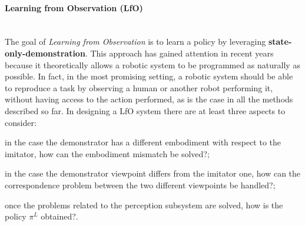 \paragraph{Learning from Observation (LfO)} \mbox{} \\
\label{sec:lfo}
The goal of \textit{Learning from Observation} is to learn a policy by leveraging \textbf{state-only-demonstration}. This approach has gained attention in recent years because it theoretically allows a robotic system to be programmed as naturally as possible. In fact, in the most promising setting, a robotic system should be able to reproduce a task by observing a human or another robot performing it, without having access to the action performed, as is the case in all the methods described so far. In designing a LfO system there are at least three aspects to consider: \begin{enumerate*}[label=\textbf{(\arabic*)}]
    \item in the case the demonstrator has a different embodiment with respect to the imitator, how can the embodiment mismatch be solved?;
    \item in the case the demonstrator viewpoint differs from the imitator one, how can the correspondence problem between the two different viewpoints be handled?;
    \item once the problems related to the perception subsystem are solved, how is the policy $\pi^{L}$ obtained?. 
\end{enumerate*}



